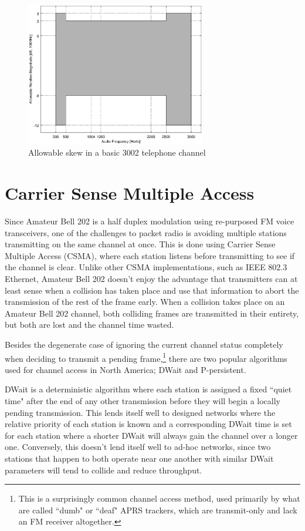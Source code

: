 \begin{figure}
	\centering
	\includegraphics[width=0.7\textwidth]{src/octave/3002}
	\caption{Allowable skew in a basic 3002 telephone channel}
	\label{fig:3002}
\end{figure}


\section{Carrier Sense Multiple Access}
\label{sec:bell202csma}

Since Amateur Bell 202 is a half duplex modulation using re-purposed 
FM voice transceivers, 
one of the challenges to packet radio is avoiding multiple stations
transmitting on the same channel at once. 
This is done using Carrier Sense Multiple Access (CSMA),
where each station listens before transmitting to see if the channel is clear.
Unlike other CSMA implementations,
such as IEEE 802.3 Ethernet, 
Amateur Bell 202 doesn't enjoy the advantage that transmitters can
at least sense when a collision has taken place 
and use that information to abort the transmission of the rest of the frame early.
When a collision takes place on an Amateur Bell 202 channel, 
both colliding frames are transmitted in their entirety, but both are lost
and the channel time wasted.

Besides the degenerate case of ignoring the current channel status completely when 
deciding to transmit a pending frame,\footnote{This is a surprisingly
	common channel access method, used primarily by what are called ``dumb" or
	``deaf" APRS trackers, which are transmit-only and lack an
FM receiver altogether.}
there are two popular algorithms used for
channel access in North America;
DWait and P-persistent.

DWait is a deterministic algorithm where each station is assigned a fixed
``quiet time" after the end of any other transmission 
before they will begin a locally pending transmission. 
This lends itself well to designed networks
where the relative priority of each station is known and a corresponding DWait time
is set for each station where a shorter DWait will 
always gain the channel over a longer one. 
Conversely, this doesn't lend itself well to ad-hoc networks,
since two stations that happen to both operate near one another 
with similar DWait parameters
will tend to collide and reduce throughput.

